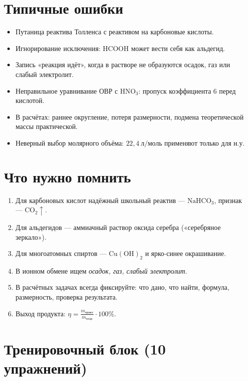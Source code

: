 \documentclass[a4paper,12pt]{article}
\begin{document}
\section{Типичные ошибки}
\begin{itemize}
    \item Путаница реактива Толленса с реактивом на карбоновые кислоты.
    \item Игнорирование исключения: \(\mathrm{HCOOH}\) может вести себя как альдегид.
    \item Запись «реакция идёт», когда в растворе не образуются осадок, газ или слабый электролит.
    \item Неправильное уравнивание ОВР с \(\mathrm{HNO_3}\): пропуск коэффициента 6 перед кислотой.
    \item В расчётах: раннее округление, потеря размерности, подмена теоретической массы практической.
    \item Неверный выбор молярного объёма: \(22{,}4\ \mathrm{л/моль}\) применяют только для н.у.
\end{itemize}

\section{Что нужно помнить}
\begin{enumerate}
    \item Для карбоновых кислот надёжный школьный реактив --- \(\mathrm{NaHCO_3}\), признак --- \(\mathrm{CO_2}\uparrow\).
    \item Для альдегидов --- аммиачный раствор оксида серебра («серебряное зеркало»).
    \item Для многоатомных спиртов --- \(\mathrm{Cu(OH)_2}\) и ярко-синее окрашивание.
    \item В ионном обмене ищем \textit{осадок, газ, слабый электролит}.
    \item В расчётных задачах всегда фиксируйте: что дано, что найти, формула, размерность, проверка результата.
    \item Выход продукта: \(\eta = \frac{m_{\text{практ}}}{m_{\text{теор}}}\cdot 100\%\).
\end{enumerate}

\newpage
\section*{Тренировочный блок (10 упражнений)}
\end{document}

